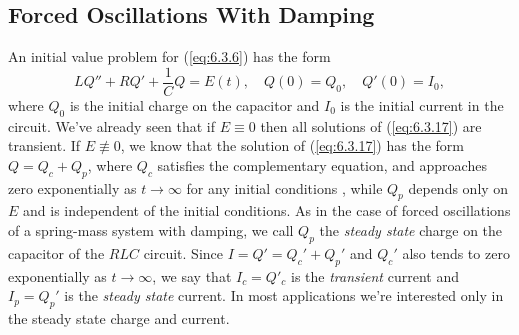 \documentclass{ximera}
\begin{document}
\subsection*{Forced Oscillations With Damping}

An initial value problem for (\ref{eq:6.3.6})  has the form
\begin{equation} \label{eq:6.3.17}
 LQ''+RQ'+\frac{1}{C}Q=E(t),\quad Q(0)=Q_0,\quad Q'(0)=I_0,
\end{equation}
where $Q_0$ is the initial charge on the capacitor and $I_0$ is the
initial current in the circuit. We've already seen that if $E\equiv0$
then all solutions of (\ref{eq:6.3.17}) are transient. If
$E\not\equiv0$, we know that the solution of (\ref{eq:6.3.17}) has
the form $Q=Q_c+Q_p$, where $Q_c$ satisfies the complementary
equation, and approaches zero exponentially as $t\rightarrow\infty$ for any
initial conditions , while $Q_p$ depends only on $E$ and is
independent of the initial conditions. As in the case of forced
oscillations of a spring-mass system with damping, we call $Q_p$ the \textit{steady state} charge on the capacitor of the $RLC$ circuit. Since
$I=Q'=Q_c'+Q_p'$ and $Q_c'$ also tends to zero exponentially as
$t\rightarrow\infty$, we say that $I_c=Q'_c$ is the \textit{transient} current
and $I_p=Q_p'$ is the \textit{steady state} current. In most
applications we're interested only in the steady state charge and
current.
\end{document}
